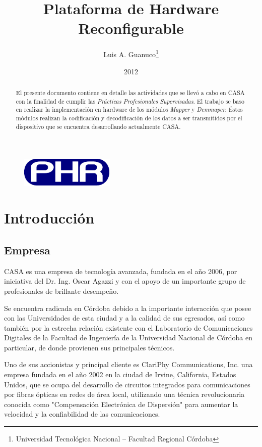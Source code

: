 \documentclass[a4paper]{article}
\author{Luis A. Guanuco\thanks{Universidad Tecnológica Nacional -- Facultad Regional Córdoba}}
\title{Plataforma de Hardware Reconfigurable}
\date{2012}
\begin{document}
\maketitle
\begin{figure}[h]
  \centering
  \includegraphics[width=0.4\textwidth]{images/logov2_ES}
\end{figure}

\begin{abstract}
  El presente documento contiene en detalle las actividades que se llevó a cabo en \ac{CASA} con la finalidad de cumplir las \emph{Prácticas Profesionales Supervisadas}. El trabajo se baso en realizar la implementación en hardware de los módulos \emph{Mapper} y \emph{Demmaper}. Éstos módulos realizan la codificación y decodificación de los datos a ser transmitidos por el dispositivo que se encuentra desarrollando actualmente \ac{CASA}.
\end{abstract}

\section{Introducción}
\label{sec:intro}

\subsection{Empresa}
\label{sec:empresa}
\ac{CASA} es una empresa de tecnología avanzada, fundada en el año 2006, por iniciativa del Dr. Ing. Oscar Agazzi y con el apoyo de un importante grupo de profesionales de brillante desempeño.

Se encuentra radicada en Córdoba debido a la importante interacción que posee con las Universidades de esta ciudad y a la calidad de sus egresados, así como también por la estrecha relación existente con el Laboratorio de Comunicaciones Digitales de la Facultad de Ingeniería de la Universidad Nacional de Córdoba en particular, de donde provienen sus principales técnicos.

Uno de sus accionistas y principal cliente es ClariPhy Communications, Inc. una empresa fundada en el año 2002 en la ciudad de Irvine, California, Estados Unidos, que se ocupa del desarrollo de circuitos integrados para comunicaciones por fibras ópticas en redes de área local, utilizando una técnica revolucionaria conocida como "Compensación Electrónica de Dispersión" para aumentar la velocidad y la confiabilidad de las comunicaciones.
\end{document}
